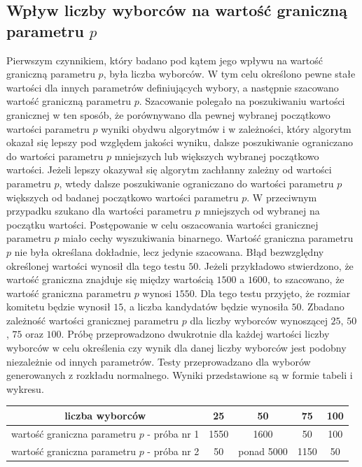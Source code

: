 \documentclass[pdflatex,11pt]{../aghdoc_version2}
\begin{document}
\subsection{Wpływ liczby wyborców na wartość graniczną parametru $p$}
Pierwszym czynnikiem, który badano pod kątem jego wpływu na wartość graniczną parametru $p$, była liczba wyborców. W tym celu określono pewne stałe wartości dla innych parametrów definiujących wybory, a następnie szacowano wartość graniczną parametru $p$. Szacowanie polegało na poszukiwaniu wartości granicznej w ten sposób, że porównywano dla pewnej wybranej początkowo wartości parametru $p$ wyniki obydwu algorytmów i w zależności, który algorytm okazał się lepszy pod względem jakości wyniku, dalsze poszukiwanie ograniczano do wartości parametru $p$ mniejszych lub większych wybranej początkowo wartości. Jeżeli lepszy okazywał się algorytm zachłanny zależny od wartości parametru $p$, wtedy dalsze poszukiwanie ograniczano do wartości parametru $p$ większych od badanej początkowo wartości parametru $p$. W przeciwnym przypadku szukano dla wartości parametru $p$ mniejszych od wybranej na początku wartości. Postępowanie w celu oszacowania wartości granicznej parametru $p$ miało cechy wyszukiwania binarnego. Wartość graniczna parametru $p$ nie była określana dokładnie, lecz jedynie szacowana. Błąd bezwzględny określonej wartości wynosił dla tego testu $50$. Jeżeli przykładowo stwierdzono, że wartość graniczna znajduje się między wartością $1500$ a $1600$, to szacowano, że wartość graniczna parametru $p$ wynosi $1550$. Dla tego testu przyjęto, że rozmiar komitetu będzie wynosił $15$, a liczba kandydatów będzie wynosiła $50$. Zbadano zależność wartości granicznej parametru $p$ dla liczby wyborców wynoszącej $25$, $50$, $75$ oraz $100$. Próbę przeprowadzono dwukrotnie dla każdej wartości liczby wyborców w celu określenia czy wynik dla danej liczby wyborców jest podobny niezależnie od innych parametrów. Testy przeprowadzano dla wyborów generowanych z rozkładu normalnego. Wyniki przedstawione są w formie tabeli i wykresu. \\

\begin{center}

\begin{tabular}{|c|c|c|c|c|}
   \hline
   liczba wyborców & 25 & 50 & 75 & 100 \\
   \hline
   wartość graniczna parametru $p$ - próba nr 1 & 1550 & 1600 & 50 & 100 \\
   \hline
   wartość graniczna parametru $p$ - próba nr 2 & 50 & ponad 5000 & 1150 & 50 \\
   \hline
\end{tabular}
\end{center}
\end{document}
